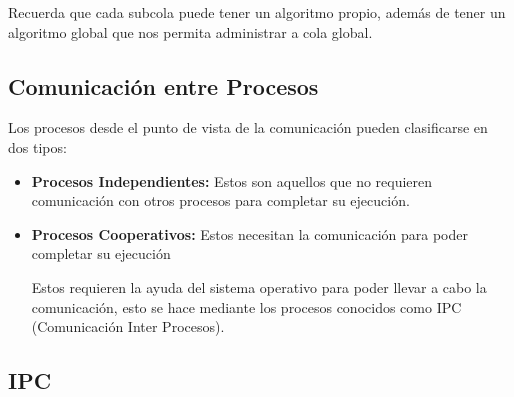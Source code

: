\documentclass[12pt, fleqn]{report}                             %
\begin{document}
                Recuerda que cada subcola puede tener un algoritmo propio, además de tener un algoritmo
                global que nos permita administrar a cola global.


            \subsection{Comunicación entre Procesos}

                Los procesos desde el punto de vista de la comunicación pueden clasificarse en dos tipos:

                \begin{itemize}
                    \item \textbf{Procesos Independientes:}
                        Estos son aquellos que no requieren comunicación con otros procesos para completar
                        su ejecución.

                    \item \textbf{Procesos Cooperativos:}
                        Estos necesitan la comunicación para poder completar su ejecución

                        Estos requieren la ayuda del sistema operativo para poder llevar a cabo la comunicación,
                        esto se hace mediante los procesos conocidos como IPC (Comunicación Inter Procesos).
                \end{itemize}

            \clearpage
            \subsection{IPC}
\end{document}

